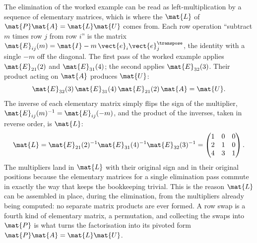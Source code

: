 \begin{example}
The elimination of the worked example can be read as left-multiplication
by a sequence of elementary matrices, which is where the $\mat{L}$ of
$\mat{P}\mat{A} = \mat{L}\mat{U}$ comes from. Each row operation
``subtract $m$ times row $j$ from row $i$'' is the matrix $\mat{E}_{ij}(m)
= \mat{I} - m\,\vect{e}_{i}\vect{e}_{j}^{\transpose}$, the identity with
a single $-m$ off the diagonal. The first pass of the worked example
applies $\mat{E}_{21}(2)$ and $\mat{E}_{31}(4)$; the second applies
$\mat{E}_{32}(3)$. Their product acting on $\mat{A}$ produces $\mat{U}$:
\[
\mat{E}_{32}(3)\,\mat{E}_{31}(4)\,\mat{E}_{21}(2)\,\mat{A} = \mat{U}.
\]
The inverse of each elementary matrix simply flips the sign of the
multiplier, $\mat{E}_{ij}(m)^{-1} = \mat{E}_{ij}(-m)$, and the product
of the inverses, taken in reverse order, is $\mat{L}$:
\[
\mat{L} = \mat{E}_{21}(2)^{-1}\mat{E}_{31}(4)^{-1}\mat{E}_{32}(3)^{-1}
= \begin{pmatrix} 1 & 0 & 0 \\ 2 & 1 & 0 \\ 4 & 3 & 1 \end{pmatrix}.
\]
The multipliers land in $\mat{L}$ with their original sign and in their
original positions because the elementary matrices for a single
elimination pass commute in exactly the way that keeps the bookkeeping
trivial. This is the reason $\mat{L}$ can be assembled in place, during
the elimination, from the multipliers already being computed: no
separate matrix products are ever formed. A row swap is a fourth kind
of elementary matrix, a permutation, and collecting the swaps into
$\mat{P}$ is what turns the factorisation into its pivoted form
$\mat{P}\mat{A} = \mat{L}\mat{U}$.
\end{example}

